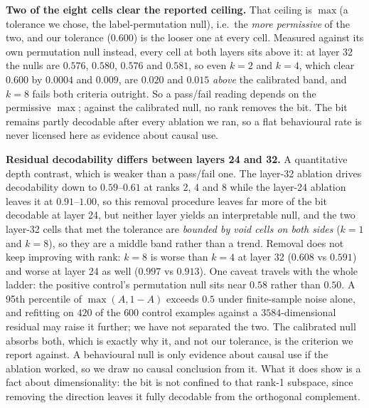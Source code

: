 \documentclass{article}
\begin{document}
\textbf{Two of the eight cells clear the reported ceiling.} That ceiling is $\max$(a tolerance we chose, the
label-permutation null), i.e.\ the \emph{more permissive} of the two, and our tolerance ($0.600$) is the
looser one at every cell. Measured against its own permutation null instead, every cell at both
layers sits above it: at layer 32 the nulls are $0.576$, $0.580$, $0.576$ and $0.581$, so even $k{=}2$ and $k{=}4$, which clear $0.600$ by $0.0004$ and $0.009$, are $0.020$ and $0.015$ \emph{above} the calibrated band, and $k{=}8$ fails both criteria outright. So a pass/fail reading depends on the permissive $\max$;
against the calibrated null, no rank removes the bit. The bit remains partly decodable after every ablation we ran, so
a flat behavioural rate is never licensed here as evidence about causal use.

\textbf{Residual decodability differs between layers 24 and 32.} A quantitative depth contrast, which is weaker than a
pass/fail one. The layer-32 ablation drives decodability down to
$0.59$--$0.61$ at ranks 2, 4 and 8 while the layer-24 ablation leaves it at $0.91$--$1.00$, so this removal procedure leaves far more of the bit decodable at layer 24, but neither layer yields an interpretable null, and the two layer-32
cells that met the tolerance are \emph{bounded by void cells on both sides} ($k{=}1$ and $k{=}8$), so they are a middle band rather
than a trend. Removal does not keep improving with rank: $k{=}8$ is worse than $k{=}4$ at layer 32
($0.608$ vs $0.591$) and worse at layer 24 as well ($0.997$ vs $0.913$). One caveat travels with the whole
ladder: the positive control's permutation null sits near $0.58$ rather than $0.50$. A 95th percentile of $\max(A, 1-A)$ exceeds $0.5$ under finite-sample noise alone, and refitting on $420$ of the $600$ control examples against a $3584$-dimensional residual may raise it further; we have not separated the two. The calibrated null absorbs both, which is exactly
why it, and not our tolerance, is the criterion we report against. A
behavioural null is only
evidence about causal use if the ablation worked, so we draw no causal conclusion from it. What it
does show is a fact about dimensionality: the bit is not confined to that rank-1 subspace, since removing
the direction leaves it fully decodable from the orthogonal complement.
\end{document}
